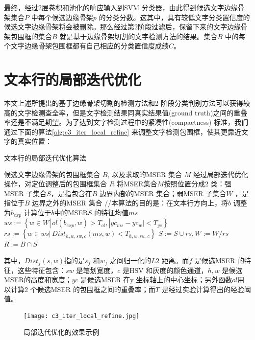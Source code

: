         最终，经过2层卷积和池化的响应输入到SVM 分类器，由此得到候选文字边缘骨架集合$P$ 中每个候选边缘骨架$p$ 的分类分数。这其中，具有较低文字分类置信度的候选文字边缘骨架将会被删除。那么经过第2阶段过滤后，保留下来的文字边缘骨架包围框的集合$B$ 就是基于边缘骨架切割的文字检测方法的结果。集合$B$ 中的每个文字边缘骨架包围框都有自己相应的分类置信度成绩$C$。

    \section{文本行的局部迭代优化}

    本文上述所提出的基于边缘骨架切割的检测方法和2 阶段分类判别方法可以获得较高的文字检测查全率，但是文字检测结果同真实结果值(ground truth)之间的重叠率还是不满足期望。为了达到文字检测过程中的紧凑性(compactness) 标准，我们通过下面的算法\ref{alg:c3_iter_local_refine} 来调整文字检测包围框，使其更靠近文字的真实位置：

    \begin{algorithm}[!h]
	\renewcommand{\algorithmicrequire}{\textbf{输入：}}
	\renewcommand{\algorithmicensure}{\textbf{输出：}}
	\caption{文本行的局部迭代优化算法}
	\label{alg:c3_iter_local_refine}
	\begin{algorithmic}[1]
		\REQUIRE 候选文字边缘骨架的包围框集合 $B$, 以及求取的MSER 集合 $M$
		\ENSURE 经过局部迭代优化操作，对定位调整后的包围框集合 $R$
		\STATE 将MSER集合$M$按照位置分成2 类：强MSER 子集合$S$，是指包含在$B$ 边界内部的MSER 集合；弱MSER 子集合$W$ ，是指位于$B$ 边界之外的MSER 集合
        \STATE //本算法的目的是：在文本行方向上，将$b$ 调整为$b_{exp}$
        \STATE 计算位于$b$中的MSER$S$ 的特征均值$ms$
		\REPEAT
        \STATE $ws:=\left\{ w \in W |\,ol(b_{exp},w)>T_{ol}, | yc_{ms}-yc_w|<T_{yc} \right\}$
        \STATE $rs:=\left\{ w \in ws |\,Dist_{h,w,sw,c}(ms,w)<T_{h,w,sw,c} \right\}$
        \STATE $S:=S\cup rs,W:=W / rs$
        \STATE $R:=B \cap S$
        \ENDFOR
	\end{algorithmic}
    \end{algorithm}

    其中，$Dist_f(s,w)$指的是$s_f$ 和$w_f$ 之间归一化的$L2$ 距离。而$f$ 是候选MSER 的特征，这些特征包含：$sw$ 是笔划宽度，$c$ 是HSV 和灰度的颜色通道，$h,w$ 是候选MSER的高度和宽度；$yc$ 是候选MSER 在y 坐标轴上的中心坐标；另外函数$ol$用以计算2 个候选MSER 的包围框之间的重叠率；而$T$ 是经过实验计算得出的经验阈值。

    \begin{figure}[!h]
    \centering
    \texttt{[image: c3\_iter\_local\_refine.jpg]} \caption{局部迭代优化的效果示例}
    \label{fig.c3_iter_local_refine}
    \end{figure}

